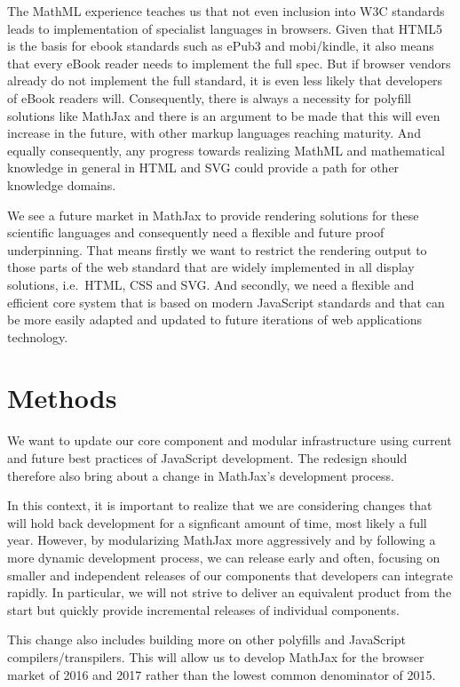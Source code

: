\documentclass[]{amsart}
\begin{document}
The MathML experience teaches us that not even inclusion into W3C
standards leads to implementation of specialist languages in browsers.
Given that HTML5 is the basis for ebook standards such as ePub3 and
mobi/kindle, it also means that every eBook reader needs to implement
the full spec. But if browser vendors already do not implement the full
standard, it is even less likely that developers of eBook readers will.
Consequently, there is always a necessity for polyfill solutions like
MathJax and there is an argument to be made that this will even increase
in the future, with other markup languages reaching maturity. And
equally consequently, any progress towards realizing MathML and
mathematical knowledge in general in HTML and SVG could provide a path
for other knowledge domains.

We see a future market in MathJax to provide rendering solutions for
these scientific languages and consequently need a flexible and future
proof underpinning. That means firstly we want to restrict the rendering
output to those parts of the web standard that are widely implemented in
all display solutions, i.e.~HTML, CSS and SVG. And secondly, we need a
flexible and efficient core system that is based on modern JavaScript
standards and that can be more easily adapted and updated to future
iterations of web applications technology.

\section{Methods}\label{methods}

We want to update our core component and modular infrastructure using
current and future best practices of JavaScript development. The
redesign should therefore also bring about a change in MathJax's
development process.

In this context, it is important to realize that we are considering
changes that will hold back development for a signficant amount of time,
most likely a full year. However, by modularizing MathJax more
aggressively and by following a more dynamic development process, we can
release early and often, focusing on smaller and independent releases of
our components that developers can integrate rapidly. In particular, we
will not strive to deliver an equivalent product from the start but
quickly provide incremental releases of individual components.

This change also includes building more on other polyfills and
JavaScript compilers/transpilers. This will allow us to develop MathJax
for the browser market of 2016 and 2017 rather than the lowest common
denominator of 2015.
\end{document}
